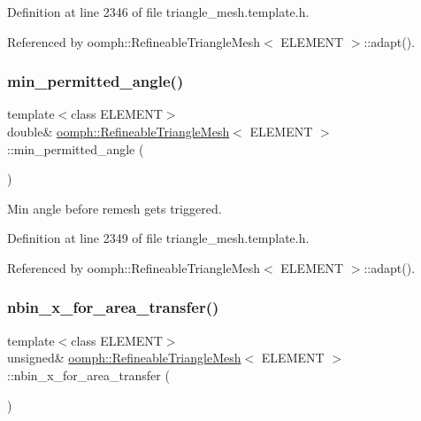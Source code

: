 Definition at line 2346 of file triangle\+\_\+mesh.\+template.\+h.



Referenced by oomph\+::\+Refineable\+Triangle\+Mesh$<$ E\+L\+E\+M\+E\+N\+T $>$\+::adapt().

\mbox{\label{classoomph_1_1RefineableTriangleMesh_a85f0515f33a727c75b80bfbbfe4b53f9}} 
\subsubsection{\texorpdfstring{min\+\_\+permitted\+\_\+angle()}{min\_permitted\_angle()}}
{\footnotesize\ttfamily template$<$class E\+L\+E\+M\+E\+NT$>$ \\
double\& \hyperlink{classoomph_1_1RefineableTriangleMesh}{oomph\+::\+Refineable\+Triangle\+Mesh}$<$ E\+L\+E\+M\+E\+NT $>$\+::min\+\_\+permitted\+\_\+angle (\begin{DoxyParamCaption}{ }\end{DoxyParamCaption})\hspace{0.3cm}{\ttfamily [inline]}}



Min angle before remesh gets triggered. 



Definition at line 2349 of file triangle\+\_\+mesh.\+template.\+h.



Referenced by oomph\+::\+Refineable\+Triangle\+Mesh$<$ E\+L\+E\+M\+E\+N\+T $>$\+::adapt().

\mbox{\label{classoomph_1_1RefineableTriangleMesh_a6c52f0bc155980b2c36fb867ce9ec2d7}} 
\subsubsection{\texorpdfstring{nbin\+\_\+x\+\_\+for\+\_\+area\+\_\+transfer()}{nbin\_x\_for\_area\_transfer()}}
{\footnotesize\ttfamily template$<$class E\+L\+E\+M\+E\+NT$>$ \\
unsigned\& \hyperlink{classoomph_1_1RefineableTriangleMesh}{oomph\+::\+Refineable\+Triangle\+Mesh}$<$ E\+L\+E\+M\+E\+NT $>$\+::nbin\+\_\+x\+\_\+for\+\_\+area\+\_\+transfer (\begin{DoxyParamCaption}{ }\end{DoxyParamCaption})\hspace{0.3cm}{\ttfamily [inline]}}



